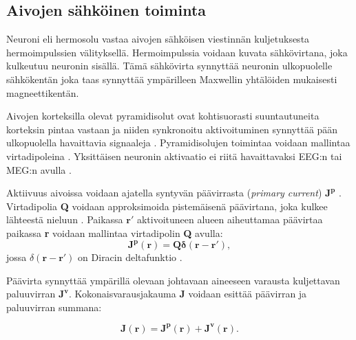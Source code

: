 \subsection{Aivojen sähköinen toiminta}
Neuroni eli hermosolu vastaa aivojen sähköisen viestinnän kuljetuksesta hermoimpulssien välityksellä. Hermoimpulssia voidaan kuvata sähkövirtana, joka kulkeutuu neuronin sisällä. Tämä sähkövirta synnyttää neuronin ulkopuolelle sähkökentän joka taas synnyttää ympärilleen Maxwellin yhtälöiden mukaisesti magneettikentän. 

Aivojen korteksilla olevat pyramidisolut ovat kohtisuorasti suuntautuneita korteksin pintaa vastaan ja niiden synkronoitu aktivoituminen synnyttää pään ulkopuolella havaittavia signaaleja \citep{He2018ElectrophysiologicalDynamics}. Pyramidisolujen toimintaa voidaan mallintaa virtadipoleina \citep[s. 10]{HariMEGprimer}. Yksittäisen neuronin aktivaatio ei riitä havaittavaksi EEG:n tai MEG:n avulla \citep{He2018ElectrophysiologicalDynamics}.

Aktiivuus aivoissa voidaan ajatella syntyvän päävirrasta (\textit{primary current}) $\mathbf{J^p}$ \citep{Baillet2001ElectromagneticMapping}. Virtadipolia \textbf{Q} voidaan approksimoida pistemäisenä päävirtana, joka kulkee lähteestä nieluun \citep{Hamalainen1993MagnetoencephalographytheoryBrain}. Paikassa $\mathbf{r'}$ aktivoituneen alueen aiheuttamaa päävirtaa paikassa \textbf{r} voidaan mallintaa virtadipolin \textbf{Q} avulla:
\begin{equation}
    \mathbf{J^p(r) = Q\delta (r-r')},
\end{equation}
jossa $\delta (\mathbf{r-r'})$ on Diracin deltafunktio \citep{Baillet2001ElectromagneticMapping}. 

Päävirta synnyttää ympärillä olevaan johtavaan aineeseen varausta kuljettavan paluuvirran $\mathbf{J^v}$. Kokonaisvarausjakauma \textbf{J} voidaan esittää päävirran ja paluuvirran summana:

\begin{equation}
    \mathbf{J(r)} = \mathbf{J^p(r)} + \mathbf{J^v(r)}.
\end{equation}
\citep{Baillet2001ElectromagneticMapping}
